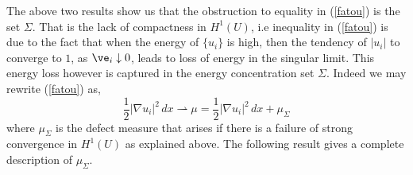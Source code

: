 The above two results show us that the obstruction to equality in (\ref{fatou}) is the set $\Sigma$. That is the lack of compactness in $H^1(U)$, i.e inequality in (\ref{fatou}) is due to the fact that when the energy of $\{u_i\}$ is high, then the tendency of $|u_i|$ to converge to $1$, as $\ve_i \downarrow 0$, leads to loss of energy in the singular limit. This energy loss however is captured in the energy concentration set $\Sigma$. Indeed we may rewrite (\ref{fatou}) as,
\begin{equation} \label{measdecom}
    \frac{1}{2}|\nabla u_i|^2 \,dx \rightharpoonup \mu= \frac{1}{2}|\nabla u_i|^2 \,dx + \mu_{\Sigma}
\end{equation} 
where $\mu_{\Sigma}$ is the defect measure that arises if there is a failure of strong convergence in $H^1(U)$ as explained above. The following result gives a complete description of $\mu_{\Sigma}$.


